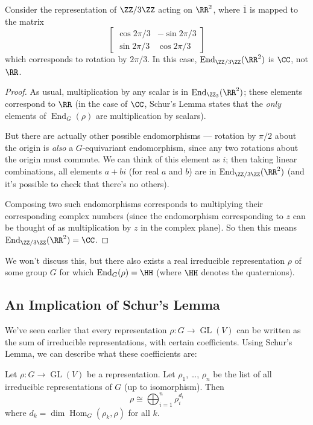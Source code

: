 \begin{example}
Consider the representation of $\ZZ/3\ZZ$ acting on $\RR^2$, where $\overline{1}$ is mapped to the matrix \[\begin{bmatrix} \cos 2\pi/3 & -\sin 2\pi/3 \\ \sin 2\pi/3 & \cos 2\pi/3 \end{bmatrix}\] which corresponds to rotation by $2\pi/3$. In this case, $\operatorname{End}_{\ZZ/3\ZZ}(\RR^2)$ is $\CC$, not $\RR$. 
\end{example}

\begin{proof}
As usual, multiplication by any scalar is in $\operatorname{End}_{\ZZ_3}(\RR^2)$; these elements correspond to $\RR$ (in the case of $\CC$, Schur's Lemma states that the \emph{only} elements of $\operatorname{End}_G(\rho)$ are multiplication by scalars). 

But there are actually other possible endomorphisms --- rotation by $\pi/2$ about the origin is \emph{also} a $G$-equivariant endomorphism, since any two rotations about the origin must commute. We can think of this element as $i$; then taking linear combinations, all elements $a + bi$ (for real $a$ and $b$) are in $\operatorname{End}_{\ZZ/3\ZZ}(\RR^2)$ (and it's possible to check that there's no others). 

Composing two such endomorphisms corresponds to multiplying their corresponding complex numbers (since the endomorphism corresponding to $z$ can be thought of as multiplication by $z$ in the complex plane). So then this means $\operatorname{End}_{\ZZ/3\ZZ}(\RR^2) = \CC$. 
\end{proof}

We won't discuss this, but there also exists a real irreducible representation $\rho$ of some group $G$ for which $\operatorname{End}_G(\rho) = \HH$ (where $\HH$ denotes the quaternions). 

\subsection{An Implication of Schur's Lemma}

We've seen earlier that every representation $\rho : G \to \operatorname{GL}(V)$ can be written as the sum of irreducible representations, with certain coefficients. Using Schur's Lemma, we can describe what these coefficients are:

\begin{corollary}
Let $\rho: G \to \operatorname{GL}(V)$ be a representation. Let $\rho_1$, \ldots, $\rho_n$ be the list of all irreducible representations of $G$ (up to isomorphism). Then \[\rho \cong \bigoplus_{i = 1}^n \rho_i^{d_i}\] where $d_k = \dim \operatorname{Hom}_G(\rho_k, \rho)$ for all $k$.
\end{corollary}

